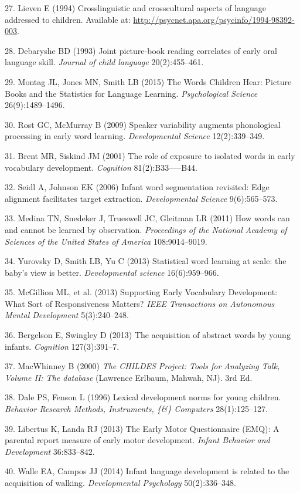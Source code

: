 \documentclass[9pt,twocolumn,twoside,]{pnas-new}
\begin{document}
\hypertarget{ref-Lieven1994}{}
27. Lieven E (1994) Crosslinguistic and crosscultural aspects of
language addressed to children. Available at:
\url{http://psycnet.apa.org/psycinfo/1994-98392-003}.

\hypertarget{ref-Debaryshe1993}{}
28. Debaryshe BD (1993) Joint picture-book reading correlates of early
oral language skill. \emph{Journal of child language} 20(2):455--461.

\hypertarget{ref-Montag2015}{}
29. Montag JL, Jones MN, Smith LB (2015) The Words Children Hear:
Picture Books and the Statistics for Language Learning.
\emph{Psychological Science} 26(9):1489--1496.

\hypertarget{ref-Rost2009}{}
30. Rost GC, McMurray B (2009) Speaker variability augments phonological
processing in early word learning. \emph{Developmental Science}
12(2):339--349.

\hypertarget{ref-Brent2001}{}
31. Brent MR, Siskind JM (2001) The role of exposure to isolated words
in early vocabulary development. \emph{Cognition} 81(2):B33-----B44.

\hypertarget{ref-Seidl2006}{}
32. Seidl A, Johnson EK (2006) Infant word segmentation revisited: Edge
alignment facilitates target extraction. \emph{Developmental Science}
9(6):565--573.

\hypertarget{ref-Medina2011}{}
33. Medina TN, Snedeker J, Trueswell JC, Gleitman LR (2011) How words
can and cannot be learned by observation. \emph{Proceedings of the
National Academy of Sciences of the United States of America}
108:9014--9019.

\hypertarget{ref-Yurovsky2013}{}
34. Yurovsky D, Smith LB, Yu C (2013) Statistical word learning at
scale: the baby's view is better. \emph{Developmental science}
16(6):959--966.

\hypertarget{ref-McGillion2013}{}
35. McGillion ML, et al. (2013) Supporting Early Vocabulary Development:
What Sort of Responsiveness Matters? \emph{IEEE Transactions on
Autonomous Mental Development} 5(3):240--248.

\hypertarget{ref-Bergelson2013}{}
36. Bergelson E, Swingley D (2013) The acquisition of abstract words by
young infants. \emph{Cognition} 127(3):391--7.

\hypertarget{ref-MacWhinney2000}{}
37. MacWhinney B (2000) \emph{The CHILDES Project: Tools for Analyzing
Talk, Volume II: The database} (Lawrence Erlbaum, Mahwah, NJ). 3rd Ed.

\hypertarget{ref-Dale1996}{}
38. Dale PS, Fenson L (1996) Lexical development norms for young
children. \emph{Behavior Research Methods, Instruments, \{\&\}
Computers} 28(1):125--127.

\hypertarget{ref-Libertus2013}{}
39. Libertus K, Landa RJ (2013) The Early Motor Questionnaire (EMQ): A
parental report measure of early motor development. \emph{Infant
Behavior and Development} 36:833--842.

\hypertarget{ref-Walle2014}{}
40. Walle EA, Campos JJ (2014) Infant language development is related to
the acquisition of walking. \emph{Developmental Psychology}
50(2):336--348.



% 
\end{document}
